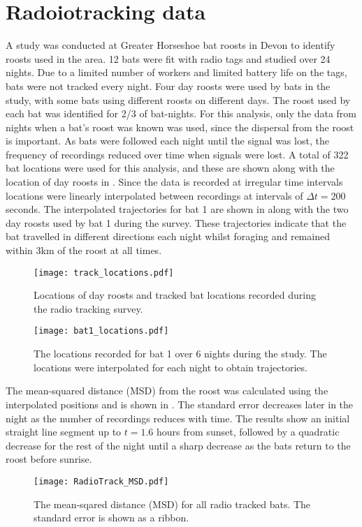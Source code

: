 \section{Radoiotracking data}


A study was conducted at Greater Horseshoe bat roosts in Devon to identify
roosts used in the area. 12 bats were fit with radio tags and studied over 24
nights. Due to a limited number of workers and limited battery life on the tags,
bats were not tracked every night. Four day roosts were used by bats in the
study, with some bats using different roosts on different days. The roost used
by each bat was identified for 2/3 of bat-nights. For this analysis, only the
data from nights when a bat's roost was known was used, since the dispersal
from the roost is important. As bats were followed each night until the signal
was lost, the frequency of recordings reduced over time when signals were lost.
A total of 322 bat locations were used for this analysis, and these are shown
along with the location of day roosts in . Since
the data is recorded at irregular time intervals locations were linearly
interpolated between recordings at intervals of $\Delta t = 200$ seconds.
The interpolated trajectories for bat 1 are shown in  along
with the two day roosts used by bat 1 during the survey. These trajectories
indicate that the bat travelled in different directions each night whilst
foraging and remained within 3km of the roost at all times.

\begin{figure} [h]
    \centering
        \texttt{[image: track\_locations.pdf]}
        \caption{Locations of day roosts and tracked bat locations recorded during the radio tracking survey.}
    \label{fig:radiotrack_locations}
\end{figure}
%
\begin{figure} [h]
    \centering
        \texttt{[image: bat1\_locations.pdf]}
        \caption{The locations recorded for bat 1 over 6 nights during the study. The locations were interpolated for each night to obtain trajectories.}
    \label{fig:bat1}
\end{figure}
%
The mean-squared distance (MSD) from the roost was calculated using the interpolated positions and is shown in . The standard error decreases later in the night as the number of recordings reduces with time. The results show an initial straight line segment up to $t = 1.6$ hours from sunset, followed by a quadratic decrease for the rest of the night until a sharp decrease as the bats return to the roost before sunrise.
%
\begin{figure} [h]
    \centering
        \texttt{[image: RadioTrack\_MSD.pdf]}
        \caption{The mean-sqared distance (MSD) for all radio tracked bats. The standard error is shown as a ribbon.}
    \label{fig:MSD}
\end{figure}
%
